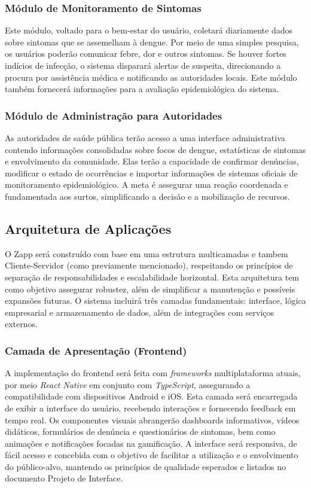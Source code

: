 \documentclass[a4paper, 12pt]{article}
\begin{document}
\subsubsection{Módulo de Monitoramento de Sintomas}

Este módulo, voltado para o bem-estar do usuário, coletará diariamente dados sobre sintomas que se assemelham à dengue.  Por meio de uma simples pesquisa, os usuários poderão comunicar febre, dor e outros sintomas.  Se houver fortes indícios de infecção, o sistema disparará alertas de suspeita, direcionando a procura por assistência médica e notificando as autoridades locais.  Este módulo também fornecerá informações para a avaliação epidemiológica do sistema.

\subsubsection{Módulo de Administração para Autoridades}

As autoridades de saúde pública terão acesso a uma interface administrativa contendo informações consolidadas sobre focos de dengue, estatísticas de sintomas e envolvimento da comunidade.  Elas terão a capacidade de confirmar denúncias, modificar o estado de ocorrências e importar informações de sistemas oficiais de monitoramento epidemiológico.  A meta é assegurar uma reação coordenada e fundamentada aos surtos, simplificando a decisão e a mobilização de recursos.


\subsection{Arquitetura de Aplicações}

O Zapp será construído com base em uma estrutura multicamadas e tambem Cliente-Servidor (como previamente mencionado), respeitando os princípios de separação de responsabilidades e escalabilidade horizontal.  Esta arquitetura tem como objetivo assegurar robustez, além de simplificar a manutenção e possíveis expansões futuras.  O sistema incluirá três camadas fundamentais: interface, lógica empresarial e armazenamento de dados, além de integrações com serviços externos.

\subsubsection{Camada de Apresentação (Frontend)}

A implementação do frontend será feita com \textit{frameworks} multiplataforma atuais, por meio \textit{React Native} em conjunto com \textit{TypeScript}, assegurando a compatibilidade com dispositivos Android e iOS.  Esta camada será encarregada de exibir a interface do usuário, recebendo interações e fornecendo feedback em tempo real.
Os componentes visuais abrangerão dashboards informativos, vídeos didáticos, formulários de denúncia e questionários de sintomas, bem como animações e notificações focadas na gamificação.  A interface será responsiva, de fácil acesso e concebida com o objetivo de facilitar a utilização e o envolvimento do público-alvo, mantendo os princípios de qualidade esperados e listados no documento Projeto de Interface.
\end{document}
